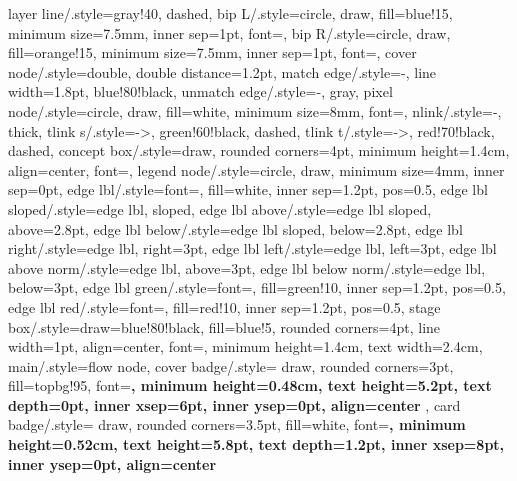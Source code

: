 {    layer line/.style={gray!40, dashed},
    bip L/.style={circle, draw, fill=blue!15, minimum size=7.5mm, inner sep=1pt, font=\small},
    bip R/.style={circle, draw, fill=orange!15, minimum size=7.5mm, inner sep=1pt, font=\small},
    cover node/.style={double, double distance=1.2pt},
    match edge/.style={-, line width=1.8pt, blue!80!black},
    unmatch edge/.style={-, gray},
    pixel node/.style={circle, draw, fill=white, minimum size=8mm, font=\footnotesize},
    nlink/.style={-, thick},
    tlink s/.style={->, green!60!black, dashed},
    tlink t/.style={->, red!70!black, dashed},
    concept box/.style={draw, rounded corners=4pt, minimum height=1.4cm, align=center, font=\small},
    legend node/.style={circle, draw, minimum size=4mm, inner sep=0pt},
    edge lbl/.style={font=\footnotesize, fill=white, inner sep=1.2pt, pos=0.5},
    edge lbl sloped/.style={edge lbl, sloped},
    edge lbl above/.style={edge lbl sloped, above=2.8pt},
    edge lbl below/.style={edge lbl sloped, below=2.8pt},
    edge lbl right/.style={edge lbl, right=3pt},
    edge lbl left/.style={edge lbl, left=3pt},
    edge lbl above norm/.style={edge lbl, above=3pt},
    edge lbl below norm/.style={edge lbl, below=3pt},
    edge lbl green/.style={font=\footnotesize, fill=green!10, inner sep=1.2pt, pos=0.5},
    edge lbl red/.style={font=\footnotesize, fill=red!10, inner sep=1.2pt, pos=0.5},
    stage box/.style={draw=blue!80!black, fill=blue!5, rounded corners=4pt, line width=1pt, align=center, font=\footnotesize, minimum height=1.4cm, text width=2.4cm},
    main/.style={flow node},
    cover badge/.style={
        draw,
        rounded corners=3pt,
        fill=topbg!95,
        font=\fontsize{7.5}{9.5}\selectfont\bfseries,
        minimum height=0.48cm,
        text height=5.2pt,
        text depth=0pt,
        inner xsep=6pt,
        inner ysep=0pt,
        align=center
    },
    card badge/.style={
        draw,
        rounded corners=3.5pt,
        fill=white,
        font=\fontsize{7.5}{9.5}\selectfont\bfseries,
        minimum height=0.52cm,
        text height=5.8pt,
        text depth=1.2pt,
        inner xsep=8pt,
        inner ysep=0pt,
        align=center
    }
}

